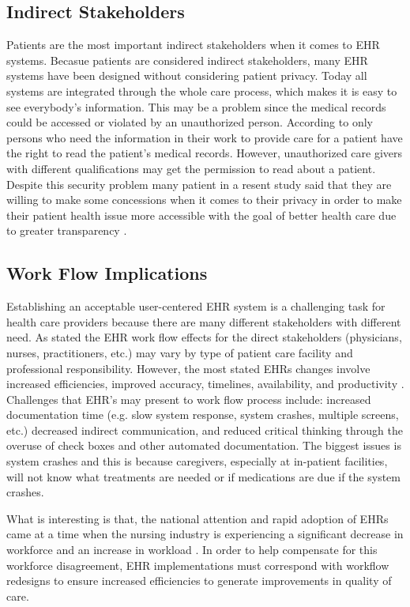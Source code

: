 \documentclass[14pt]{article}
\begin{document}
\subsection{Indirect Stakeholders}
\label{sec:peopleIndirect}
Patients are the most important indirect stakeholders when it comes to \gls{EHR} systems. Becasue patients are considered indirect stakeholders, many \gls{EHR} systems have been designed without considering patient privacy. Today all systems are integrated through the whole care process, which makes it is easy to see everybody's information. This may be a problem since the medical records could be accessed or violated by an unauthorized person. According to \cite{PatientDataAct} only persons who need the information in their work to provide care for a patient have the right to read the patient's medical records. However, unauthorized care givers with different qualifications may get the permission to read  about a  patient. Despite this security problem many patient in a resent study said that they are willing to make some concessions when it comes to their privacy in order to make their patient health issue more accessible with the goal of better health care due to greater transparency \cite{Merrill}.


\subsection{Work Flow Implications}
\label{sec:peopleWorkflow}
Establishing an acceptable user-centered \gls{EHR} system is a challenging task for health care providers because there are many different stakeholders with different need. As stated the \gls{EHR} work flow effects for the direct stakeholders (physicians, nurses, practitioners, etc.) may vary by type of patient care facility and professional responsibility. However, the most stated \glspl{EHR} changes involve increased efficiencies, improved accuracy, timelines, availability, and productivity \cite{Allan}. Challenges that  \gls{EHR}'s may present to work flow process include: increased documentation time (e.g. slow system response, system crashes, multiple screens, etc.) decreased indirect communication, and reduced critical thinking through the overuse of check boxes and other automated documentation. The biggest issues is system crashes and this is because caregivers, especially at in-patient facilities, will not know what treatments are needed or if medications are due if the system crashes. 

\newpage 
What is interesting is that, the national attention and rapid adoption of \gls{EHR}s came at a time when the nursing industry is experiencing a significant decrease in workforce and an increase in workload \cite{MITRE}. In order to help compensate for this workforce disagreement, \gls{EHR} implementations must correspond with workflow redesigns to ensure increased efficiencies to generate improvements in quality of care. 
\end{document}
